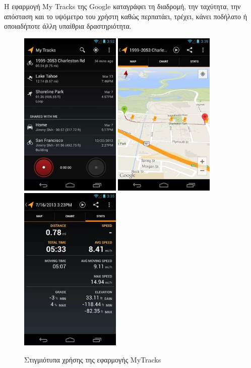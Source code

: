 \documentclass[12pt,twoside,openright]{report}
\begin{document}
Η εφαρμογή \lt My Tracks \gt της \lt Google \gt καταγράφει  τη διαδρομή, την ταχύτητα, την απόσταση και το υψόμετρο του χρήστη καθώς περπατάει, τρέχει, κάνει ποδήλατο ή οποιαδήποτε άλλη υπαίθρια δραστηριότητα.
\begin{figure}[H]
\includegraphics[height=8cm]{images/mt1}
\hspace{0.4in}
\includegraphics[height=8cm]{images/mt2}
\hspace{0.4in}
\includegraphics[height=8cm]{images/mt3}
\caption{Στιγμιότυπα χρήσης της εφαρμογής \lt MyTracks \gt}
\end{figure}
\end{document}
